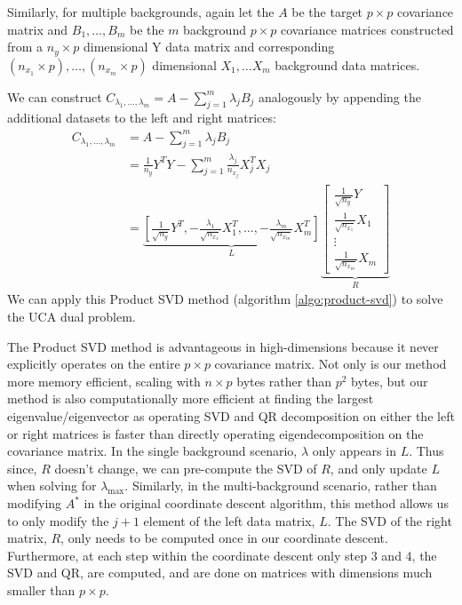 \documentclass[12pt]{article}
\begin{document}
Similarly, for multiple backgrounds, again let the $A$ be the target $p \times p$ covariance matrix and $ B_1, \ldots, B_m$ be the $m$ background $p \times p$ covariance matrices constructed from a $n_y \times p$ dimensional Y data matrix and corresponding $(n_{x_1} \times p), \ldots, (n_{x_m}\times p)$ dimensional $X_1, \ldots X_m$ background data matrices.

We can construct $C_{\lambda_1, \ldots, \lambda_m} = A - \sum^{m}_{j=1}\lambda_jB_j$ analogously by appending the additional datasets to the left and right matrices:
\begin{align}
  C_{\lambda_1, \ldots, \lambda_m}&= A - \sum^{m}_{j=1}\lambda_jB_j \nonumber \\
                                  &=\frac{1}{n_y}Y^{T}Y -\sum_{j=1}^{m}{\frac{\lambda_{j}}{n_{x_j}}X_{j}^TX_{j}} \nonumber\\
                                  &=  \underbrace{\left[\frac{1}{\sqrt{n_y}}Y^T, -\frac{\lambda_1}{\sqrt{n_{x_{1}}}} X^T_1, \ldots, -\frac{\lambda_m}{\sqrt{n_{x_{m}}}}X^T_m\right]}_{L} \underbrace{\begin{bmatrix} \frac{1}{\sqrt{n_{y}}}Y \\ \frac{1}{\sqrt{n_{x_{1}}}}X_1 \\ \vdots \\ \frac{1}{\sqrt{n_{x_{m}}}}X_m \end{bmatrix}}_{R} \label{eq:8}
\end{align}
We can apply this Product SVD method (algorithm \ref{algo:product-svd}) to solve the UCA dual problem.

The Product SVD method is advantageous in high-dimensions because it never explicitly operates on the entire $p \times p$ covariance matrix. Not only is our method more memory efficient, scaling with $n\times p$ bytes rather than $p^2$ bytes, but our method is also computationally more efficient at finding the largest eigenvalue/eigenvector as operating SVD and QR decomposition on either the left or right matrices is faster than directly operating eigendecomposition on the covariance matrix. In the single background scenario,  $\lambda$ only appears in $L$. Thus since, $R$ doesn't change, we can pre-compute the SVD of $R$, and only update $L$ when solving for $\lambda_{\text{max}}$.
Similarly, in the multi-background scenario, rather than modifying $A^*$ in the original coordinate descent algorithm, this method allows us to only modify the $j+1$ element of the left data matrix, $L$.
The SVD of the right matrix, $R$, only needs to be computed once in our coordinate descent. Furthermore, at each step within the coordinate descent only step 3 and 4, the SVD and QR, are computed, and are done on matrices with dimensions much smaller than $p \times p$.
\end{document}
